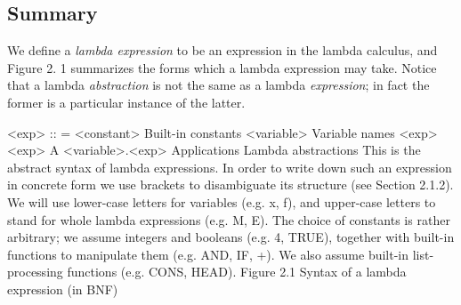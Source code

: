 \subsection{Summary}
We define a \textit{lambda expression} to be an expression in the lambda calculus, and
Figure 2. 1 summarizes the forms which a lambda expression may take. Notice
that a lambda \textit{abstraction} is not the same as a lambda \textit{expression}; in fact the
former is a particular instance of the latter.

<exp> :: = <constant>
Built-in constants
<variable>
Variable names
<exp> <exp>
A <variable>.<exp>
Applications
Lambda abstractions
This is the abstract syntax of lambda expressions. In order to write down
such an expression in concrete form we use brackets to disambiguate its
structure (see Section 2.1.2).
We will use lower-case letters for variables (e.g. x, f), and upper-case
letters to stand for whole lambda expressions (e.g. M, E).
The choice of constants is rather arbitrary; we assume integers and
booleans (e.g. 4, TRUE), together with built-in functions to manipulate
them (e.g. AND, IF, +). We also assume built-in list-processing functions
(e.g. CONS, HEAD).
Figure 2.1 Syntax of a lambda expression (in BNF)